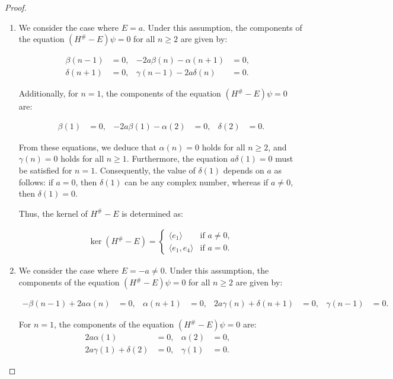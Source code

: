 \documentclass{amsart}
\theoremstyle{definition}
\theoremstyle{remark}
\begin{document}
\begin{proof}
\begin{enumerate}
Consequently, the dimension of the kernel of $H^{\#}-E$ is infinite, i.e., \(\dim(\ker(H^\# - E)) = \infty\).

\item We consider the case where \(E = a\). Under this assumption, the components of the equation $(H^{\#}-E)\psi=0$ for all \(n \geq 2\) are given by:

\begin{align*}
\beta(n - 1) &= 0, &
-2a \beta(n) - \alpha(n + 1) &= 0, &\\
\delta(n + 1) &= 0, &
\gamma(n - 1) - 2a \delta(n) &= 0.
\end{align*}

Additionally, for \(n = 1\), the components of the equation $(H^{\#}-E)\psi=0$ are:

\begin{align*}
\beta(1) &= 0, &
-2a \beta(1) - \alpha(2) &= 0, &
\delta(2) &= 0.
\end{align*}

From these equations, we deduce that \(\alpha(n) = 0\) holds for all \(n \geq 2\), and \(\gamma(n) = 0\) holds for all \(n \geq 1\). Furthermore, the equation \(a \delta(1) = 0\) must be satisfied for \(n = 1\). Consequently, the value of \(\delta(1)\) depends on \(a\) as follows: if \(a = 0\), then \(\delta(1)\) can be any complex number, whereas if \(a \neq 0\), then \(\delta(1) = 0\).

Thus, the kernel of \(H^\# - E\) is determined as:

\begin{align*}
\ker(H^\# - E) =
\begin{cases}
    \langle e_1 \rangle & \text{if } a \neq 0, \\
    \langle e_1, e_4 \rangle & \text{if } a = 0.
\end{cases}
\end{align*}

\item We consider the case where \(E = -a \neq 0\). Under this assumption, the components of the equation \((H^\# - E)\psi = 0\) for all \(n \geq 2\) are given by:

\begin{align*}
-\beta(n - 1) + 2a \alpha(n) &= 0, &
\alpha(n + 1) &= 0, &
2a \gamma(n) + \delta(n + 1) &= 0, &
\gamma(n - 1) &= 0.
\end{align*}

For \(n = 1\), the components of the equation \((H^\# - E)\psi = 0\) are:
\begin{align*}
2a \alpha(1) &= 0, &
\alpha(2) &= 0, &\\
2a \gamma(1) + \delta(2) &= 0, &
\gamma(1) &= 0.
\end{align*}


\end{enumerate}
\end{proof}
\end{document}
